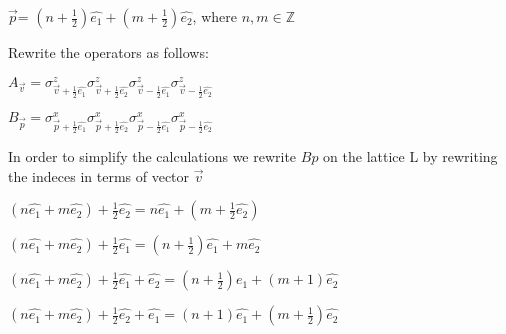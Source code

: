 \documentclass[12pt]{report}
\begin{document}
\begin{minipage}{1\textwidth}
\begin{center}
			$\vec{p}$= $(n + \frac{1}{2}) \hat{e_1} + (m + \frac{1}{2}) \hat{e_2}$, where $n,m \in \mathbb{Z}$\newline
		\end{center}
		
		Rewrite the operators as follows:\newline
		
		\begin{center}
			
			$A_{\vec{v}} = \sigma^z_{\vec{v}+\frac{1}{2}\hat{e_1}} \sigma^z_{\vec{v}+\frac{1}{2}\hat{e_2}} \sigma^z_{\vec{v}-\frac{1}{2}\hat{e_1}} \sigma^z_{\vec{v}-\frac{1}{2}\hat{e_2}}$ \newline
			
			$B_{\vec{p}} = \sigma^x_{\vec{p}+\frac{1}{2}\hat{e_1}} \sigma^x_{\vec{p}+\frac{1}{2}\hat{e_2}} \sigma^x_{\vec{p}-\frac{1}{2}\hat{e_1}} \sigma^x_{\vec{p}-\frac{1}{2}\hat{e_2}}$\newline
			
		\end{center}
		
		In order to simplify the calculations we rewrite $Bp$ on the lattice L by rewriting the indeces in terms of vector $\vec{v}$
		
		\begin{center}
			$(n\hat{e_1} + m\hat{e_2}) + \frac{1}{2}\hat{e_2}= n\hat{e_1} + (m+\frac{1}{2}\hat{e_2})$\newline
			
			$(n\hat{e_1} + m\hat{e_2}) + \frac{1}{2}\hat{e_1}= (n+ \frac{1}{2})\hat{e_1} + m\hat{e_2}$\newline
			
			$(n\hat{e_1} + m\hat{e_2}) + \frac{1}{2}\hat{e_1}+\hat{e_2}= (n+ \frac{1}{2})\hat{e_1} + (m + 1)\hat{e_2}$\newline
			
			$(n\hat{e_1} + m\hat{e_2}) + \frac{1}{2}\hat{e_2}+\hat{e_1}= (n+ 1)\hat{e_1} + (m + \frac{1}{2})\hat{e_2}$\newline
		\end{center}
		
		
		
		
	\end{minipage}
	
\end{document}
